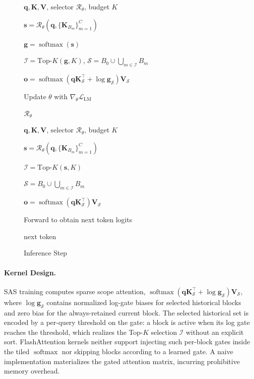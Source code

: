 \begin{figure}[!t]
\centering
\newcommand{\algstrut}{\rule[-1.0ex]{0pt}{3.0ex}}
\begin{minipage}[t]{0.48\textwidth}
\begin{algorithm}[H]
\caption{\our Training Step}
\label{alg:ours_train}
\begin{algorithmic}[1]
\Require \algstrut $\mathbf{q},\mathbf{K},\mathbf{V}$, selector $\mathcal{R}_{\theta}$, budget $K$
\State \algstrut $\mathbf{s}=\mathcal{R}_{\theta}\left(\mathbf{q},\{\mathbf{K}_{B_m}\}_{m=1}^{C}\right)$
\State \algstrut $\mathbf{g}=\operatorname{softmax}(\mathbf{s})$
\State \algstrut $\mathcal{I}=\text{Top-}K(\mathbf{g},K)$, $\mathcal{S}=B_0\cup\bigcup_{m\in\mathcal{I}}B_m$
\State \algstrut $\mathbf{o}=\operatorname{softmax}(\mathbf{q}\mathbf{K}^{\top}_{\mathcal{S}}+\log\mathbf{g}_{\mathcal{S}})\mathbf{V}_{\mathcal{S}}$
\State \algstrut Update $\theta$ with $\nabla_{\theta}\mathcal{L}_{\mathrm{LM}}$
\State \algstrut \Return $\mathcal{R}_{\theta}$
\end{algorithmic}
\end{algorithm}
\end{minipage}
\hfill
\begin{minipage}[t]{0.48\textwidth}
\begin{algorithm}[H]
\caption{\our Inference Step}
\label{alg:ours_infer}
\begin{algorithmic}[1]
\Require \algstrut $\mathbf{q},\mathbf{K},\mathbf{V}$, selector $\mathcal{R}_{\theta}$, budget $K$
\State \algstrut $\mathbf{s}=\mathcal{R}_{\theta}\left(\mathbf{q},\{\mathbf{K}_{B_m}\}_{m=1}^{C}\right)$
\State \algstrut $\mathcal{I}=\text{Top-}K(\mathbf{s},K)$
\State \algstrut $\mathcal{S}=B_0\cup\bigcup_{m\in\mathcal{I}}B_m$
\State \algstrut $\mathbf{o}=\operatorname{softmax}\left(\mathbf{q}\mathbf{K}_{\mathcal{S}}^{\top}\right)\mathbf{V}_{\mathcal{S}}$
\State \algstrut Forward to obtain next token logits
\State \algstrut \Return next token
\end{algorithmic}
\end{algorithm}
\end{minipage}
\label{fig:ours_algorithm}
\end{figure}


\paragraph{Kernel Design.}
SAS training computes sparse scope attention, $\operatorname{softmax}(\mathbf{q}\mathbf{K}^\top_{\mathcal{S}}+\log\mathbf{g}_{\mathcal{S}})\mathbf{V}_{\mathcal{S}}$, where $\log\mathbf{g}_{\mathcal{S}}$ contains normalized log-gate biases for selected historical blocks and zero bias for the always-retained current block.
The selected historical set is encoded by a per-query threshold on the gate: a block is active when its log gate reaches the threshold, which realizes the Top-$K$ selection $\mathcal{I}$ without an explicit sort.
FlashAttention \cite{dao2022flashattention} kernels neither support injecting such per-block gates inside the tiled $\operatorname{softmax}$ nor skipping blocks according to a learned gate.
A naive implementation materializes the gated attention matrix, incurring prohibitive memory overhead.


